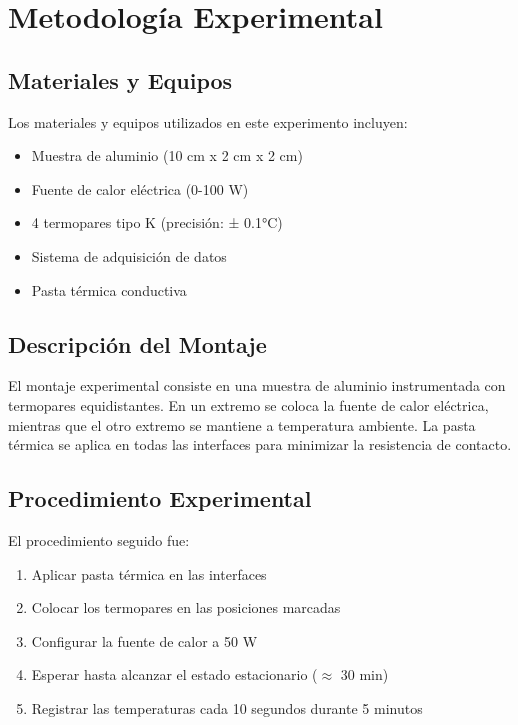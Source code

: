\documentclass[9pt,a4paper,twocolumn,twoside]{lab-class/lab}
\begin{document}
\section{Metodología Experimental}
    \subsection{Materiales y Equipos}

        Los materiales y equipos utilizados en este experimento incluyen:
        \begin{itemize}
            \item Muestra de aluminio (10 cm x 2 cm x 2 cm)
            \item Fuente de calor eléctrica (0-100 W)
            \item 4 termopares tipo K (precisión: ± 0.1°C)
            \item Sistema de adquisición de datos
            \item Pasta térmica conductiva
        \end{itemize}

    \subsection{Descripción del Montaje}

        El montaje experimental consiste en una muestra de aluminio instrumentada con termopares equidistantes. En un extremo se coloca la fuente de calor eléctrica, mientras que el otro extremo se mantiene a temperatura ambiente. La pasta térmica se aplica en todas las interfaces para minimizar la resistencia de contacto.

    \subsection{Procedimiento Experimental}

        El procedimiento seguido fue:
        \begin{enumerate}
            \item Aplicar pasta térmica en las interfaces
            \item Colocar los termopares en las posiciones marcadas
            \item Configurar la fuente de calor a 50 W
            \item Esperar hasta alcanzar el estado estacionario ($\approx$ 30 min)
            \item Registrar las temperaturas cada 10 segundos durante 5 minutos
        \end{enumerate}
\end{document}

